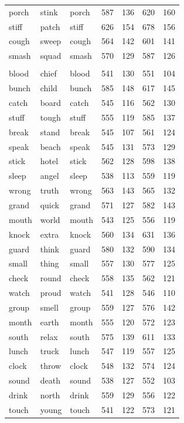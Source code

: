 \documentclass[
]{interact}
\begin{document}
\begin{table}
\begin{tabular*}{\linewidth}{@{\extracolsep{\fill}}lllrrrr}
porch & stink & porch & 587 & 136 & 620 & 160 \\ 
stiff & patch & stiff & 626 & 154 & 678 & 156 \\ 
cough & sweep & cough & 564 & 142 & 601 & 141 \\ 
smash & squad & smash & 570 & 129 & 587 & 126 \\ 
\midrule\addlinespace[2.5pt]
\multicolumn{7}{l}{\emph{high frequency condition}} \\[2.5pt] 
\midrule\addlinespace[2.5pt]
blood & chief & blood & 541 & 130 & 551 & 104 \\ 
bunch & child & bunch & 585 & 148 & 617 & 145 \\ 
catch & board & catch & 545 & 116 & 562 & 130 \\ 
stuff & tough & stuff & 555 & 119 & 585 & 137 \\ 
break & stand & break & 545 & 107 & 561 & 124 \\ 
speak & beach & speak & 545 & 131 & 573 & 129 \\ 
stick & hotel & stick & 562 & 128 & 598 & 138 \\ 
sleep & angel & sleep & 538 & 113 & 559 & 119 \\ 
wrong & truth & wrong & 563 & 143 & 565 & 132 \\ 
grand & quick & grand & 571 & 127 & 582 & 143 \\ 
mouth & world & mouth & 543 & 125 & 556 & 119 \\ 
knock & extra & knock & 560 & 134 & 631 & 136 \\ 
guard & think & guard & 580 & 132 & 590 & 134 \\ 
small & thing & small & 557 & 130 & 577 & 125 \\ 
check & round & check & 558 & 135 & 562 & 121 \\ 
watch & proud & watch & 541 & 128 & 546 & 110 \\ 
group & smell & group & 559 & 127 & 576 & 142 \\ 
month & earth & month & 555 & 120 & 572 & 123 \\ 
south & relax & south & 575 & 139 & 611 & 133 \\ 
lunch & truck & lunch & 547 & 119 & 557 & 125 \\ 
clock & throw & clock & 548 & 132 & 574 & 124 \\ 
sound & death & sound & 538 & 127 & 552 & 103 \\ 
drink & north & drink & 559 & 129 & 556 & 122 \\ 
touch & young & touch & 541 & 122 & 573 & 121 \\ 

\end{tabular*}
\end{table}
\end{document}

